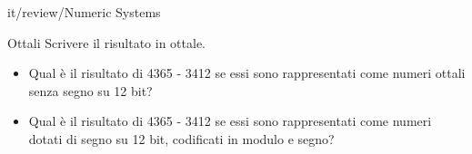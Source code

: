 \documentclass[11pt]{article}
\begin{document}
\begin{quiz}{it/review/Numeric Systems}
\begin{cloze}[points=1,shuffle=false]{Ottali}
Scrivere il risultato in ottale.
\begin{itemize}
\item Qual è il risultato di 4365 - 3412 se essi sono rappresentati come numeri ottali senza segno su 12 bit? 
\item Qual è il risultato di 4365 - 3412 se essi sono rappresentati come numeri dotati di segno su 12 bit, codificati in modulo e segno? 
\end{itemize}
\end{cloze}

\end{quiz}
\end{document}
